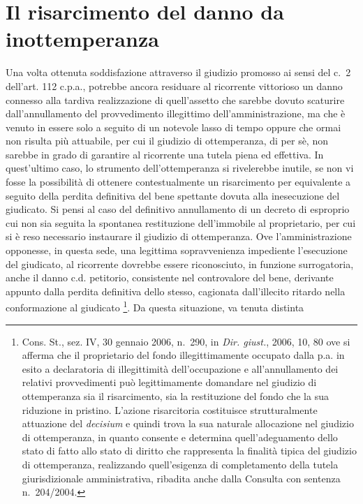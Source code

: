 \documentclass[12pt,it,a4paper,]{report}
\begin{document}
\hypertarget{il-risarcimento-del-danno-da-inottemperanza}{%
\section{Il risarcimento del danno da
inottemperanza}\label{il-risarcimento-del-danno-da-inottemperanza}}

Una volta ottenuta soddisfazione attraverso il giudizio promosso ai
sensi del c.~2 dell'art. 112 c.p.a., potrebbe ancora residuare al
ricorrente vittorioso un danno connesso alla tardiva realizzazione di
quell'assetto che sarebbe dovuto scaturire dall'annullamento del
provvedimento illegittimo dell'amministrazione, ma che è venuto in
essere solo a seguito di un notevole lasso di tempo oppure che ormai non
risulta più attuabile, per cui il giudizio di ottemperanza, di per sè,
non sarebbe in grado di garantire al ricorrente una tutela piena ed
effettiva. In quest'ultimo caso, lo strumento dell'ottemperanza si
rivelerebbe inutile, se non vi fosse la possibilità di ottenere
contestualmente un risarcimento per equivalente a seguito della perdita
definitiva del bene spettante dovuta alla inesecuzione del giudicato. Si
pensi al caso del definitivo annullamento di un decreto di esproprio cui
non sia seguita la spontanea restituzione dell'immobile al proprietario,
per cui si è reso necessario instaurare il giudizio di ottemperanza. Ove
l'amministrazione opponesse, in questa sede, una legittima
sopravvenienza impediente l'esecuzione del giudicato, al ricorrente
dovrebbe essere riconosciuto, in funzione surrogatoria, anche il danno
c.d. petitorio, consistente nel controvalore del bene, derivante appunto
dalla perdita definitiva dello stesso, cagionata dall'illecito ritardo
nella conformazione al giudicato \footnote{Cons. St., sez. IV, 30
  gennaio 2006, n.~290, in \emph{Dir. giust.}, 2006, 10, 80 ove si
  afferma che il proprietario del fondo illegittimamente occupato dalla
  p.a. in esito a declaratoria di illegittimità dell'occupazione e
  all'annullamento dei relativi provvedimenti può legittimamente
  domandare nel giudizio di ottemperanza sia il risarcimento, sia la
  restituzione del fondo che la sua riduzione in pristino. L'azione
  risarcitoria costituisce strutturalmente attuazione del
  \emph{decisium} e quindi trova la sua naturale allocazione nel
  giudizio di ottemperanza, in quanto consente e determina
  quell'adeguamento dello stato di fatto allo stato di diritto che
  rappresenta la finalità tipica del giudizio di ottemperanza,
  realizzando quell'esigenza di completamento della tutela
  giurisdizionale amministrativa, ribadita anche dalla Consulta con
  sentenza n.~204/2004.}. Da questa situazione, va tenuta distinta
\end{document}
